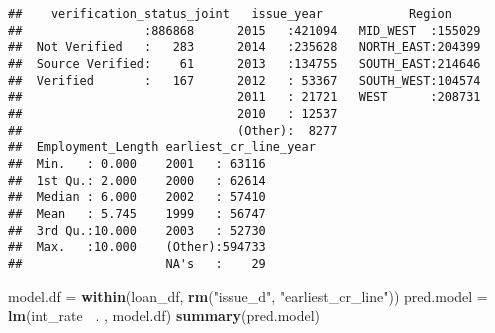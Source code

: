 \documentclass[]{article}
\newenvironment{Shaded}{\begin{snugshade}}{\end{snugshade}}
\newcommand{\KeywordTok}[1]{\textcolor[rgb]{0.13,0.29,0.53}{\textbf{#1}}}
\newcommand{\StringTok}[1]{\textcolor[rgb]{0.31,0.60,0.02}{#1}}
\newcommand{\OperatorTok}[1]{\textcolor[rgb]{0.81,0.36,0.00}{\textbf{#1}}}
\newcommand{\NormalTok}[1]{#1}
\begin{document}
\begin{verbatim}
##    verification_status_joint   issue_year            Region      
##                 :886868      2015   :421094   MID_WEST  :155029  
##  Not Verified   :   283      2014   :235628   NORTH_EAST:204399  
##  Source Verified:    61      2013   :134755   SOUTH_EAST:214646  
##  Verified       :   167      2012   : 53367   SOUTH_WEST:104574  
##                              2011   : 21721   WEST      :208731  
##                              2010   : 12537                      
##                              (Other):  8277                      
##  Employment_Length earliest_cr_line_year
##  Min.   : 0.000    2001   : 63116       
##  1st Qu.: 2.000    2000   : 62614       
##  Median : 6.000    2002   : 57410       
##  Mean   : 5.745    1999   : 56747       
##  3rd Qu.:10.000    2003   : 52730       
##  Max.   :10.000    (Other):594733       
##                    NA's   :    29
\end{verbatim}

\begin{Shaded}
\begin{Highlighting}[]
\NormalTok{model.df =}\StringTok{ }\KeywordTok{within}\NormalTok{(loan_df, }\KeywordTok{rm}\NormalTok{(}\StringTok{"issue_d"}\NormalTok{, }\StringTok{"earliest_cr_line"}\NormalTok{))}
\NormalTok{pred.model =}\StringTok{ }\KeywordTok{lm}\NormalTok{(int_rate }\OperatorTok{~}\NormalTok{. , model.df)}
\KeywordTok{summary}\NormalTok{(pred.model)}
\end{Highlighting}
\end{Shaded}
\end{document}

